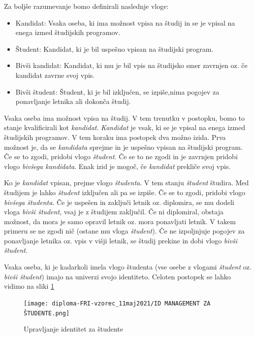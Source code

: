 \documentclass[a4paper,12pt,openright]{book}
\begin{document}
{Za boljše razumevanje bomo definirali naslednje vloge:
\begin{itemize}
    \item Kandidat: Vsaka oseba, ki ima možnost vpisa na študij in se je vpisal na enega izmed študijskih programov.
    \item Študent: Kandidat, ki je bil uspešno vpisan na študijski program. 
    \item Bivši kandidat: Kandidat, ki mu je bil vpis na študijsko smer zavrnjen oz. če kandidat zavrne svoj vpis.
    \item Bivši študent: Študent, ki je bil izključen, se izpiše,nima pogojev za ponavljanje letnika ali dokonča študij.
    
\end{itemize}

Vsaka oseba ima možnost vpisa na študij. V tem trenutku v postopku, bomo to stanje kvalificirali kot \emph{kandidat}. \emph{Kandidat}  je vsak, ki se je vpisal na enega izmed študijskih programov. V tem koraku ima postopek dva možno izida. Prva možnost je, da se \emph{kandidata} sprejme in je uspešno vpisan na študijski program. Če se to zgodi, pridobi vlogo \emph{študent}. Če se to ne zgodi in je zavrnjen pridobi vlogo \emph{ bivšega kandidata}. Enak izid je mogoč, če \emph{kandidat} prekliče svoj vpis. \newline

Ko je \emph{kandidat} vpisan, prejme vlogo \emph{študenta}. V tem stanju \emph{študent} študira. Med študijem je lahko \emph{študent} izključen ali pa se izpiše. Če se to zgodi, pridobi vlogo \emph{bivšega študenta}. Če je uspešen in zaključi letnik oz. diplomira, se mu dodeli vloga \emph{bivši študent}, vsaj je z študijem zaključil. Če ni diplomiral, obstaja možnost, da mora je samo opravil letnik oz. mora ponavljati letnik. V takem primeru se ne zgodi nič (ostane mu vloga \emph{študent}). Če ne izpoljnjuje pogojev za ponavljanje letnika oz. vpis v višji letnik, se študij prekine in dobi vlogo \emph{bivši študent}.

Vsaka oseba, ki je kadarkoli imela vlogo študenta (vse osebe z vlogami \emph{študent} oz. \emph{bivši študent}) imajo na univerzi svojo identiteto. 
Celoten postopek se lahko vidimo na sliki \ref{fig:student}

\begin{figure}[H]
\texttt{[image: diploma-FRI-vzorec\_11maj2021/ID MANAGEMENT ZA ŠTUDENTE.png]}
\caption{Upravljanje identitet za študente}
\label{fig:student}
\end{figure}



}
\end{document}
